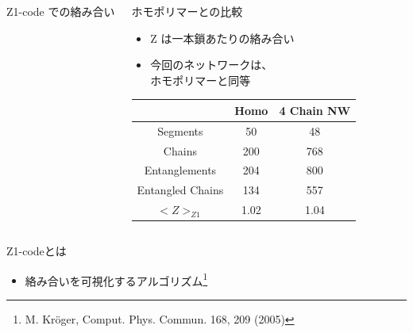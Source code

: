 \documentclass[12pt, dvipdfmx]{beamer}
\begin{document}
\begin{frame}
\begin{columns}[onlytextwidth]
                Z1-code での絡み合い
            \begin{block}{ホモポリマーとの比較}
                \begin{itemize}
                    \item Z は一本鎖あたりの絡み合い
                    \item 今回のネットワークは、\\ホモポリマーと同等
                \end{itemize}
                \scriptsize
                \begin{center}
                    \begin{tabular}{c||c|c} \hline
                        &Homo & 4 Chain NW \\ \hline \hline
                        Segments& 50& 48 \\ \hline
                        Chains & 200& 768 \\ \hline
                        Entanglements& 204& 800\\ \hline
                        Entangled Chains&134&557 \\ \hline
                        \alert{$<Z>_{Z1}$}&\alert{1.02}& \alert{1.04}\\ \hline
                    \end{tabular}
                \end{center}
            \end{block}
        \end{columns}
    \begin{alertblock}{Z1-codeとは}
        \begin{itemize}
            \item 絡み合いを可視化するアルゴリズム\footnote{
                M. Kröger, Comput. Phys. Commun. 168, 209 (2005)
            }
        \end{itemize}
    \end{alertblock}
\end{frame}
\end{document}
